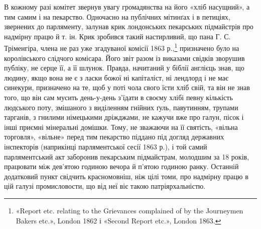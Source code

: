 В кожному разі комітет звернув увагу громадянства на його
«хліб насущний», а тим самим і на пекарство. Одночасно на публічних
мітинґах і в петиціях, звернених до парляменту, залунав
крик лондонських пекарських підмайстрів про надмірну працю
й т. ін. Крик зробився такий настирливий, що пана Г. С. Тріменгіра,
члена не раз уже згадуваної комісії 1863 р.,\footnote{
«Report etc. relating to the Grievances complained of by the
Journeymen Bakers etc.», London 1862 і «Second Report etc.», London
1863.
} призначено
було на королівського слідчого комісара. Його звіт разом із виказами
свідків зворушив публіку, не серце її, а її шлунок. Правда,
начитаний у біблії англієць знав, що людину, якщо вона не є з
ласки божої ні капіталіст, ні лендлорд і не має синекури, призначено
на те, щоб у поті чола свого їсти хліб свій, та він не знав
того, що він сам мусить день-у-день з’їдати в своєму хлібі
певну кількість людського поту, змішаного з виділенням гнійних
ґуль, павутинням, трупами тарганів, з гнилими німецькими дріжджами,
не кажучи вже про галун, пісок і інші приємні мінеральні
домішки. Тому, не зважаючи на її святість, «вільна торговля»,
«вільне» перед тим пекарство піддано під догляд державних
інспекторів (наприкінці парляментської сесії 1863 р.), і той самий
парляментський акт заборонив пекарським підмайстрам, молодшим
за 18 років, працювати між дев’ятою годиною вечора й п’ятою
годиною ранку. Останній додатковий пункт свідчить красномовніш,
ніж цілі томи, про надмірну працю в цій галузі промисловости,
що від неї віє такою патріярхальністю.

